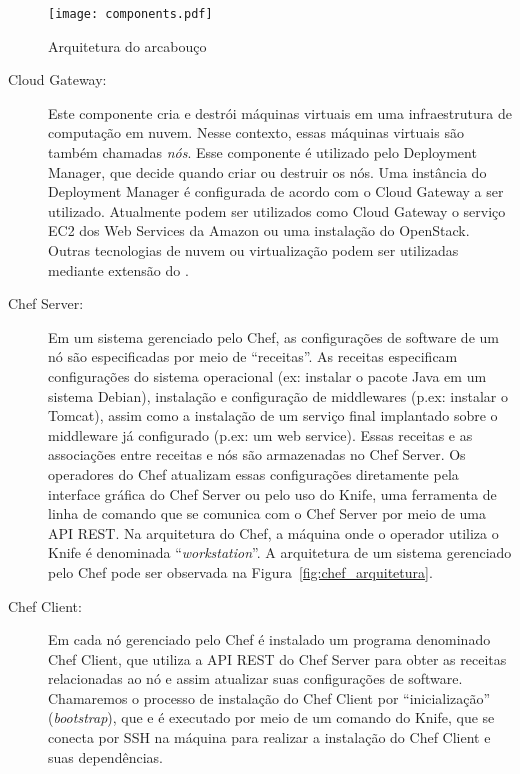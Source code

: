 \begin{figure}[!h]
  \centering
  \texttt{[image: components.pdf]} 
  \caption{Arquitetura do arcabouço \ee}
  \label{fig:ee_componentes} 
\end{figure}

\begin{description}

\item [Cloud Gateway:]

Este componente cria e destrói máquinas virtuais em uma infraestrutura de computação em nuvem. Nesse contexto, essas máquinas virtuais são também chamadas \emph{nós}. Esse componente é utilizado pelo Deployment Manager, que decide quando criar ou destruir os nós. Uma instância do Deployment Manager é configurada de acordo com o Cloud Gateway a ser utilizado. Atualmente podem ser utilizados como Cloud Gateway o serviço EC2 dos Web Services da Amazon ou uma instalação do OpenStack. Outras tecnologias de nuvem ou virtualização podem ser utilizadas mediante extensão do \dm.

\item [Chef Server:]

Em um sistema gerenciado pelo Chef, as configurações de software de um nó são especificadas por meio de ``receitas''. As receitas especificam configurações do sistema operacional (ex: instalar o pacote Java em um sistema Debian), instalação e configuração de middlewares (p.ex: instalar o Tomcat), assim como a instalação de um serviço final implantado sobre o middleware já configurado (p.ex: um web service). Essas receitas e as associações entre receitas e nós são armazenadas no Chef Server. Os operadores do Chef atualizam essas configurações diretamente pela interface gráfica do Chef Server ou pelo uso do Knife, uma ferramenta de linha de comando que se comunica com o Chef Server por meio de uma API REST. Na arquitetura do Chef, a máquina onde o operador utiliza o Knife é denominada ``\textit{workstation}''. A arquitetura de um sistema gerenciado pelo Chef pode ser observada na Figura~\ref{fig:chef_arquitetura}.

\item [Chef Client:]

Em cada nó gerenciado pelo Chef é instalado um programa denominado Chef Client, que utiliza a API REST do Chef Server para obter as receitas relacionadas ao nó e assim atualizar suas configurações de software. Chamaremos o processo de instalação do Chef Client por ``inicialização'' (\textit{bootstrap}), que e é executado por meio de um comando do Knife, que se conecta por SSH na máquina para realizar a instalação do Chef Client e suas dependências.


\end{description}
